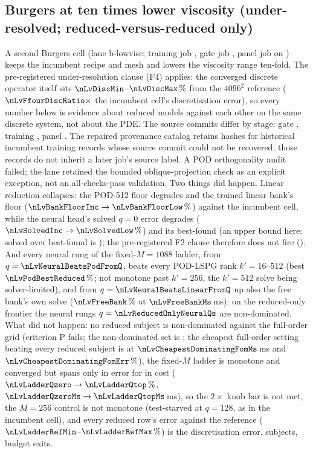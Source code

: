 \subsection{Burgers at ten times lower viscosity (under-resolved; reduced-versus-reduced only)}
\label{app:extended:lowvisc}
A second Burgers cell (lane b-lowvisc; training job \provLvTrainJob, gate
job \provLvGateJob, panel job \provLvPanelJob{} on \provLvGpu) keeps the
incumbent recipe and mesh and lowers the viscosity range ten-fold. The
pre-registered under-resolution clause (F4) applies: the converged
discrete operator itself sits $\nLvDiscMin$--$\nLvDiscMax\,\%$ from the
$4096^2$ reference ($\nLvFfourDiscRatio\times$ the incumbent cell's
discretisation error), so every number below is evidence about reduced
models against each other on the same discrete system, not about the PDE.
The source commits differ by stage: gate \texttt{\provLvGateCommit},
training \texttt{\provLvTrainCommit}, panel \texttt{\provLvPanelCommit}.
The repaired provenance catalog retains hashes for historical incumbent
training records whose source commit could not be recovered; those
records do not inherit a later job's source label. A POD orthogonality
audit failed; the lane retained the bounded oblique-projection check as
an explicit exception, not an all-checks-pass validation.
Two things did happen. Linear reduction collapses: the POD-512 floor
degrades \nLvPodFiveTwelveCollapse{} and the trained linear bank's floor
\nLvBankFloorCollapse{} ($\nLvBankFloorInc\to\nLvBankFloorLow\,\%$)
against the incumbent cell, while the neural head's solved $q=0$ error
degrades \nLvSolvedRatio{} ($\nLvSolvedInc\to\nLvSolvedLow\,\%$) and its
best-found \nLvBestFoundRatio{} (an upper bound here: solved over
best-found is \nLvSolvedOverBestFound); the pre-registered F2 clause
therefore does not fire (\nLvFtwoFires). And every neural rung of the fixed-$M=1088$ ladder, from
$q=\nLvNeuralBeatsPodFromQ$, beats every POD-LSPG rank $k'=16$--$512$ (best
$\nLvPodBestReduced\,\%$; not monotone past $k'=256$, the $k'=512$ solve
being solver-limited), and from $q=\nLvNeuralBeatsLinearFromQ$ up also the
free bank's own solve ($\nLvFreeBank\,\%$ at $\nLvFreeBankMs$\,ms): on
the reduced-only frontier the neural rungs $q=\nLvReducedOnlyNeuralQs$ are
non-dominated. What did not happen:
no reduced subject is non-dominated against the full-order grid (criterion
P fails; the non-dominated set is \nLvNonDomList; the cheapest full-order
setting beating every reduced subject is \nLvCheapestDominatingFom{} at
$\nLvCheapestDominatingFomMs$\,ms and $\nLvCheapestDominatingFomErr\,\%$),
the fixed-$M$ ladder is monotone and converged but spans only
\nLvLadderErrSpan{} in error for \nLvLadderCostSpan{} in cost
($\nLvLadderQzero\to\nLvLadderQtop\,\%$, $\nLvLadderQzeroMs\to\nLvLadderQtopMs$\,ms),
so the $2\times$ knob bar is not met, the $M=256$ control is not monotone
(test-starved at $q=128$, as in the incumbent cell), and every reduced row's
error against the reference ($\nLvLadderRefMin$--$\nLvLadderRefMax\,\%$)
is the discretisation error. \nLvSubjects{} subjects, \nLvBudgetExitsTotal{}
budget exits.

